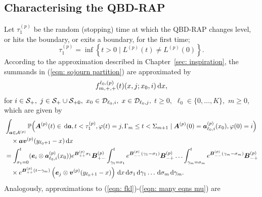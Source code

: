 \subsection{Characterising the QBD-RAP} 
Let \(\tau_1^{(p)}\) be the random (stopping) time at which the QBD-RAP changes level, or hits the boundary, or exits a boundary, for the first time;
\[\tau_1^{(p)} = \inf\left\{t>0\mid L^{(p)}(t)\neq L^{(p)}(0)\right\}.\]
According to the approximation described in Chapter~\ref{sec: inspiration}, the summands in (\ref{eqn: sojourn partition}) are approximated by \[f^{\ell_0,(p)}_{m,+,+}(t)( x,j; x_0,i)\, \mathrm{d} x,\] 
for \(i\in\mathcal{S}_+,\) \(j\in\mathcal{S}_+\cup\mathcal{S}_{+0},\) \(x_0\in\mathcal{D}_{\ell_0,i},\) \(x\in\mathcal{D}_{\ell_0,j},\) \(t\geq0,\) \(\ell_0\in\{0,\dots,K\},\) \(m\geq 0\), which are given by
\begin{align}
	&\int_{\boldsymbol a \in\mathcal A^{(p)}}\mathbb P\Big(\boldsymbol A^{(p)}(t)\in \, \mathrm{d} \boldsymbol a, t<\tau_1^{(p)}, \varphi(t) = j, \Gamma_m\leq t<\Sigma_{m+1} \nonumber
	\mid \boldsymbol A^{(p)}(0) = \boldsymbol   a_{\ell_0,i}^{(p)}(x_0), \varphi(0) = i\Big)
	\\&\quad \times \boldsymbol a{\boldsymbol v}^{(p)}(y_{\ell_0+1}-x)\, \mathrm{d} x\nonumber
	\\
	&=\int_{\sigma_1=0}^t (\boldsymbol e_i\otimes \boldsymbol  a_{\ell_0,i}^{(p)}(x_0)) e^{\boldsymbol{B}^{(p)}_{++}\sigma_1}\boldsymbol{B}^{(p)}_{+-}	\nonumber
	\int_{\gamma_1=\sigma_1}^{t} e^{\boldsymbol{B}^{(p)}_{--}(\gamma_1-\sigma_1)}\boldsymbol{B}^{(p)}_{-+}
	\hdots 
	 \int_{\gamma_m=\sigma_{m}}^{t} e^{\boldsymbol{B}^{(p)}_{--}(\gamma_m-\sigma_{m})}\boldsymbol{B}^{(p)}_{-+}\\&\quad\times
	e^{\boldsymbol{B}^{(p)}_{++}(t-\gamma_m)}\left(\boldsymbol e_j  \otimes {\boldsymbol v}^{(p)}(y_{\ell_0+1}-x)\right)\, \mathrm{d} x
	\, \mathrm{d} \sigma_1\, \mathrm{d} \gamma_1\dots \, \mathrm{d} \sigma_m\, \mathrm{d} \gamma_m. \label{eqn: approx end conv}
\end{align}
Analogously, approximations to (\ref{eqn: fkl})-(\ref{eqn: many eqns mu}) are 
